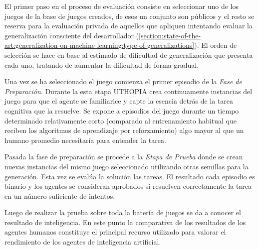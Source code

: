 El primer paso en el proceso de evaluación consiste en seleccionar uno de los juegos de la base de juegos creados, de esos un conjunto son públicos y el resto se reserva para la evaluación privada de aquellos que apliquen intentando evaluar la generalización consciente del desarrollador (\ref{section:state-of-the-art:generalization-on-machine-learning:type-of-generalizations}). El orden de selección se hace en base al estimado de dificultad de generalización que presenta cada uno, tratando de aumentar la dificultad de forma gradual.

Una vez se ha seleccionado el juego comienza el primer episodio de la \textit{Fase de Preparación}. Durante la esta etapa UTHOPIA crea continuamente instancias del juego para que el agente se familiarice y capte la esencia detrás de la tarea cognitiva que la resuelve. Se expone a episodios del juego durante un tiempo determinado relativamente corto (comparado al entrenamiento habitual que reciben los algoritmos de aprendizaje por reforzamiento) algo mayor al que un humano promedio necesitaría para entender la tarea.

Pasada la fase de preparación se procede a la \textit{Etapa de Prueba} donde se crean nuevas instancias del mismo juego seleccionado utilizando otras semillas para la generación. Esta vez se evalúa la solución las tareas. El resultado cada episodio es binario y los agentes se consideran aprobados si resuelven correctamente la tarea en un número suficiente de intentos.

Luego de realizar la prueba sobre toda la batería de juegos se da a conocer el resultado de inteligencia. En este punto la comparativa de los resultados de los agentes humanos constituye el principal recurso utilizado para valorar el rendimiento de los agentes de inteligencia artificial.

